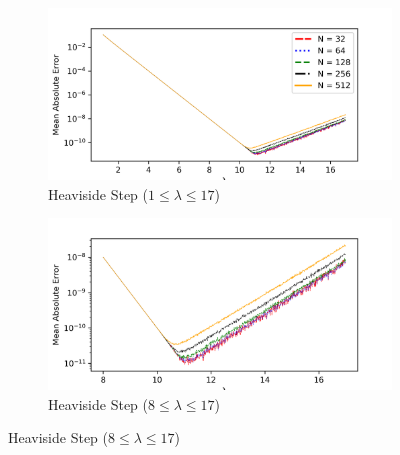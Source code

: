 \documentclass[a4paper]{report}
\begin{document}
\begin{figure}[H]
    \begin{subfigure}{.475\linewidth}
      \includegraphics[width=\linewidth]{images/abate_whitt/heaviside.png}
      \caption{Heaviside Step ($1 \leq \lambda \leq 17$)}
    \end{subfigure}\hfill
    \begin{subfigure}{.475\linewidth}
      \includegraphics[width=\linewidth]{images/abate_whitt/heaviside_zoomed.png}
      \caption{Heaviside Step ($8 \leq \lambda \leq 17$)}
    \end{subfigure}
    
    \medskip
    

\end{figure}
\end{document}
